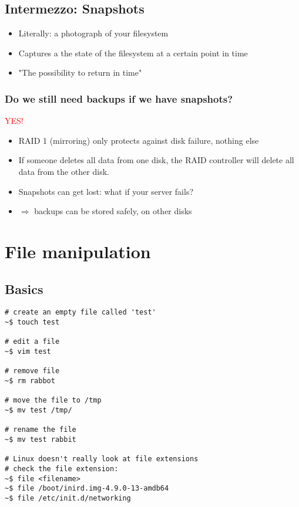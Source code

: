 \documentclass{article}
\begin{document}
\subsection{Intermezzo: Snapshots}

\begin{itemize}
    \item Literally: a photograph of your filesystem
    \item Captures a the state of the filesystem at a certain point in time
    \item "The possibility to return in time"
\end{itemize}

\subsubsection{Do we still need backups if we have snapshots?}

\textcolor{red}{YES!}

\begin{itemize}
    \item RAID 1 (mirroring) only protects against disk failure, nothing else
    \item If someone deletes all data from one disk, the RAID controller will delete all data from the other disk.
    \item Snapshots can get lost: what if your server fails?
    \item $\Rightarrow$ backups can be stored safely, on other disks
\end{itemize}

\section{File manipulation}

\subsection{Basics}

\begin{verbatim}
# create an empty file called 'test'
~$ touch test

# edit a file
~$ vim test

# remove file
~$ rm rabbot

# move the file to /tmp
~$ mv test /tmp/

# rename the file
~$ mv test rabbit

# Linux doesn't really look at file extensions
# check the file extension:
~$ file <filename>
~$ file /boot/inird.img-4.9.0-13-amdb64
~$ file /etc/init.d/networking
\end{verbatim}
\end{document}
